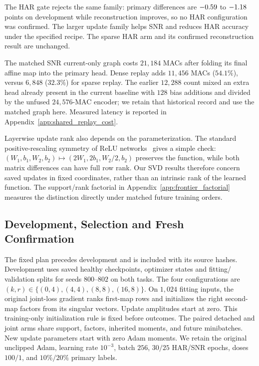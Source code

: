 The HAR gate rejects the same family: primary differences are $-0.59$
to $-1.18$ points on development while reconstruction improves, so no
HAR configuration was confirmed. The larger update family helps SNR and reduces HAR accuracy under the
specified recipe. The sparse HAR arm and its confirmed
reconstruction result are unchanged.

The matched SNR current-only graph costs $21{,}184$ MACs after folding its
final affine map into the primary head. Dense replay adds $11{,}456$ MACs
($54.1\%$), versus $6{,}848$ ($32.3\%$) for sparse replay. The earlier
$12{,}288$ count mixed an extra head already present in the current baseline
with $128$ bias additions and divided by the unfused $24{,}576$-MAC encoder;
we retain that historical record and use the matched graph here. Measured latency is reported in
Appendix~\ref{app:shared_replay_cost}.

Layerwise update rank also depends on the parameterization. The standard
positive-rescaling symmetry of ReLU networks~\citep{dinh2017sharp} gives a
simple check: $(W_1,b_1,W_2,b_2)\mapsto(2W_1,2b_1,W_2/2,b_2)$ preserves
the function, while both matrix differences can have full row rank.
Our SVD results therefore concern saved updates in fixed coordinates,
rather than an intrinsic rank of the learned function. The support/rank
factorial in Appendix~\ref{app:frontier_factorial} measures the distinction
directly under matched future training orders.

\subsection{Development, Selection and Fresh Confirmation}\label{app:shared_replay_protocol}

The fixed plan precedes development and is included with its source hashes.
Development uses saved healthy checkpoints, optimizer states and fitting/
validation splits for seeds $800$--$802$ on both tasks. The four configurations
are $(k,r)\in\{(0,4),(4,4),(8,8),(16,8)\}$. On $1{,}024$ fitting inputs,
the original joint-loss gradient ranks first-map rows and initializes the
right second-map factors from its singular vectors. Update amplitudes start
at zero. This training-only initialization rule is fixed before outcomes.
The paired detached and joint arms share support, factors, inherited moments,
and future minibatches. New update parameters start with zero Adam moments.
We retain the original unclipped Adam, learning rate $10^{-3}$, batch $256$,
$30/25$ HAR/SNR epochs, doses $100/1$, and $10\%/20\%$ primary labels.

